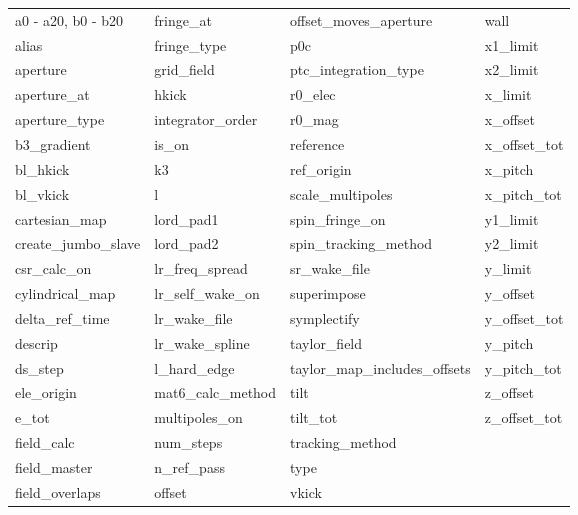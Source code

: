  \begin{tabular}{llll} \toprule
a0 - a20, b0 - b20          & fringe_at                   & offset_moves_aperture       & wall                        \\
alias                       & fringe_type                 & p0c                         & x1_limit                    \\
aperture                    & grid_field                  & ptc_integration_type        & x2_limit                    \\
aperture_at                 & hkick                       & r0_elec                     & x_limit                     \\
aperture_type               & integrator_order            & r0_mag                      & x_offset                    \\
b3_gradient                 & is_on                       & reference                   & x_offset_tot                \\
bl_hkick                    & k3                          & ref_origin                  & x_pitch                     \\
bl_vkick                    & l                           & scale_multipoles            & x_pitch_tot                 \\
cartesian_map               & lord_pad1                   & spin_fringe_on              & y1_limit                    \\
create_jumbo_slave          & lord_pad2                   & spin_tracking_method        & y2_limit                    \\
csr_calc_on                 & lr_freq_spread              & sr_wake_file                & y_limit                     \\
cylindrical_map             & lr_self_wake_on             & superimpose                 & y_offset                    \\
delta_ref_time              & lr_wake_file                & symplectify                 & y_offset_tot                \\
descrip                     & lr_wake_spline              & taylor_field                & y_pitch                     \\
ds_step                     & l_hard_edge                 & taylor_map_includes_offsets & y_pitch_tot                 \\
ele_origin                  & mat6_calc_method            & tilt                        & z_offset                    \\
e_tot                       & multipoles_on               & tilt_tot                    & z_offset_tot                \\
field_calc                  & num_steps                   & tracking_method             &                             \\
field_master                & n_ref_pass                  & type                        &                             \\
field_overlaps              & offset                      & vkick                       &                             \\
 \bottomrule
 \end{tabular}
